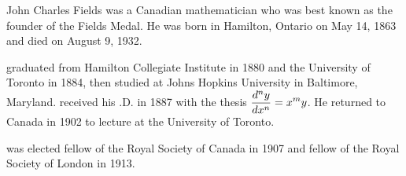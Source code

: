 \documentclass[12pt]{article}
\begin{document}
John Charles Fields was a Canadian mathematician who was best known as the founder of the Fields Medal. He was born in Hamilton, Ontario on May 14, 1863 and died on August 9, 1932.

 graduated from Hamilton Collegiate Institute in 1880 and the University of Toronto in 1884, then studied at Johns Hopkins University in Baltimore, Maryland.  received his .D. in 1887 with the thesis {\it {}} $\displaystyle {{d^n y} \over {dx^n}} = x^m y$. He returned to Canada in 1902 to lecture at the University of Toronto.

 was elected fellow of the Royal Society of Canada in 1907 and fellow of the Royal Society of London in 1913.
\end{document}
